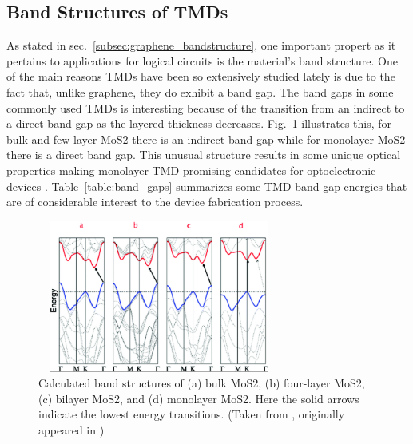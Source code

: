 \subsection{Band Structures of \acp{TMD}}\label{subsec:tmd_properties}
\noindent As stated in sec.~\ref{subsec:graphene_bandstructure}, one important propert as it pertains to applications for logical circuits is the material's band structure. One of the main reasons \acp{TMD} have been so extensively studied lately is due to the fact that, unlike graphene, they do exhibit a band gap. The band gaps in some commonly used \acp{TMD} is interesting because of the transition from an indirect to a direct band gap as the layered thickness decreases. Fig.~\ref{fig:mos2_bandstructure} illustrates this, for bulk and few-layer \acs{MoS2} there is an indirect band gap while for monolayer \acs{MoS2} there is a direct band gap. This unusual structure results in some unique optical properties making monolayer \acs{TMD} promising candidates for optoelectronic devices \cite{Cheng_NanoLett2014,Conley_NanoLett2013}. Table~\ref{table:band_gaps} summarizes some \acs{TMD} band gap energies that are of considerable interest to the device fabrication process. 
\begin{figure}[ht]
	\centering
	\includegraphics[height=5cm,width=8cm]{figs/intro/mos2_bandstructure}
	\caption[Band structures of \acs{MoS2}]{Calculated band structures of (a) bulk \acs{MoS2}, (b) four-layer \acs{MoS2}, (c) bilayer \acs{MoS2}, and (d) monolayer \acs{MoS2}. Here the solid arrows indicate the lowest energy transitions. (Taken from \cite{Lee_Nanoscale2014}, originally appeared in \cite{Splendiani_Nanolett2010})}
	\label{fig:mos2_bandstructure}
\end{figure}
 
